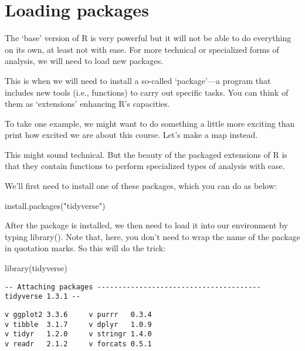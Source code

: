 \documentclass[
  letterpaper,
  DIV=11,
  numbers=noendperiod]{scrreprt}
\newenvironment{Shaded}{\begin{snugshade}}{\end{snugshade}}
\newcommand{\FunctionTok}[1]{\textcolor[rgb]{0.28,0.35,0.67}{#1}}
\newcommand{\NormalTok}[1]{\textcolor[rgb]{0.00,0.23,0.31}{#1}}
\newcommand{\StringTok}[1]{\textcolor[rgb]{0.13,0.47,0.30}{#1}}
\begin{document}
\hypertarget{loading-packages}{%
\section*{Loading packages}\label{loading-packages}}

The `base' version of R is very powerful but it will not be able to do
everything on its own, at least not with ease. For more technical or
specialized forms of analysis, we will need to load new packages.

This is when we will need to install a so-called `package'---a program
that includes new tools (i.e., functions) to carry out specific tasks.
You can think of them as `extensions' enhancing R's capacities.

To take one example, we might want to do something a little more
exciting than print how excited we are about this course. Let's make a
map instead.

This might sound technical. But the beauty of the packaged extensions of
R is that they contain functions to perform specialized types of
analysis with ease.

We'll first need to install one of these packages, which you can do as
below:

\begin{Shaded}
\begin{Highlighting}[]
\FunctionTok{install.packages}\NormalTok{(}\StringTok{"tidyverse"}\NormalTok{)}
\end{Highlighting}
\end{Shaded}

After the package is installed, we then need to load it into our
environment by typing library(). Note that, here, you don't need to wrap
the name of the package in quotation marks. So this will do the trick:

\begin{Shaded}
\begin{Highlighting}[]
\FunctionTok{library}\NormalTok{(tidyverse)}
\end{Highlighting}
\end{Shaded}

\begin{verbatim}
-- Attaching packages --------------------------------------- tidyverse 1.3.1 --
\end{verbatim}

\begin{verbatim}
v ggplot2 3.3.6     v purrr   0.3.4
v tibble  3.1.7     v dplyr   1.0.9
v tidyr   1.2.0     v stringr 1.4.0
v readr   2.1.2     v forcats 0.5.1
\end{verbatim}
\end{document}

